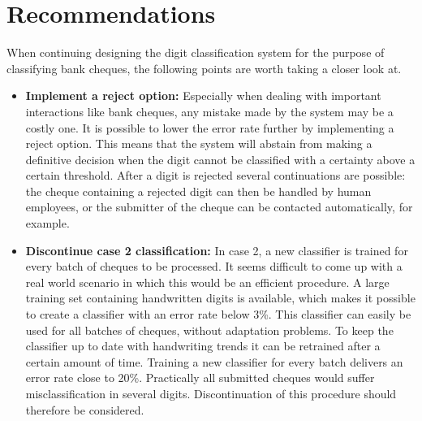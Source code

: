 \section{Recommendations}

When continuing designing the digit classification system for the purpose of classifying bank cheques, the following points are worth taking a closer look at. 
\begin{itemize}
	\item \textbf{Implement a reject option:} Especially when dealing with important interactions like bank cheques, any mistake made by the system may be a costly one. It is possible to lower the error rate further by implementing a reject option. This means that the system will abstain from making a definitive decision when the digit cannot be classified with a certainty above a certain threshold. After a digit is rejected several continuations are possible: the cheque containing a rejected digit can then be handled by human employees, or the submitter of the cheque can be contacted automatically, for example.	
	\item \textbf{Discontinue case 2 classification:} In case 2, a new classifier is trained for every batch of cheques to be processed. It seems difficult to come up with a real world scenario in which this would be an efficient procedure. A large training set containing handwritten digits is available, which makes it possible to create a classifier with an error rate below 3\%. This classifier can easily be used for all batches of cheques, without adaptation problems. To keep the classifier up to date with handwriting trends it can be retrained after a certain amount of time. 
	Training a new classifier for every batch delivers an error rate close to 20\%. Practically all submitted cheques would suffer misclassification in several digits. Discontinuation of this procedure should therefore be considered.
	

\end{itemize}
